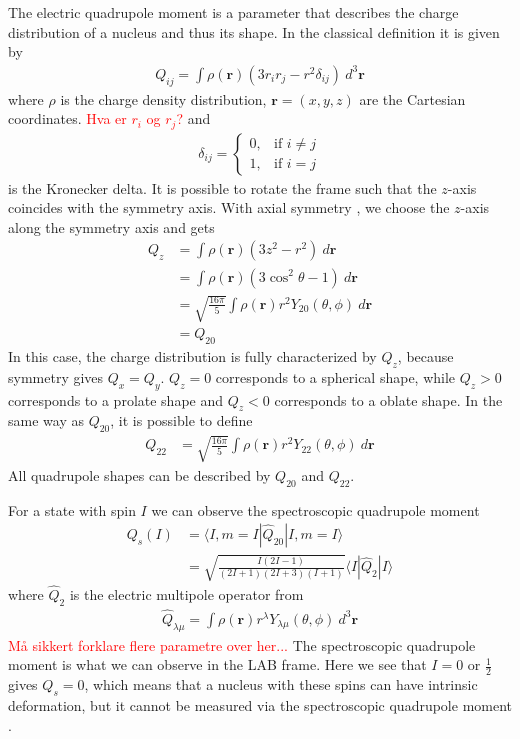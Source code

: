 \documentclass[twoside,english]{uiofysmaster/uiofysmaster}
\begin{document}
The electric quadrupole moment is a parameter that describes the charge distribution of a nucleus and thus its shape.
In the classical definition it is given by
\begin{align}
	Q_{ij} = \int \rho(\mathbf{r}) (3r_i r_j - r^2 \delta_{ij}) ~d^3 \mathbf{r}
\end{align}
where $\rho$ is the charge density distribution, $\mathbf{r} = (x, y, z)$ are the Cartesian coordinates. 
\textcolor{red}{Hva er $r_i$ og $r_j$?}
and
\begin{align}
	\delta_{ij} =
    \begin{cases}
    		0, & \text{if } i \neq j \\
    		1, & \text{if } i = j
    \end{cases}
\end{align}
is the Kronecker delta.
It is possible to rotate the frame such that the $z$-axis coincides with the symmetry axis. 
With axial symmetry \cite{Niedermaier, ELP}, we choose the $z$-axis along the symmetry axis and gets
\begin{align}
	Q_z &= \int \rho(\mathbf{r}) (3z^2 - r^2) ~d \mathbf{r} \nonumber \\
	&=  \int \rho(\mathbf{r}) (3\cos^2 \theta - 1) ~d \mathbf{r} \nonumber \\
	&=  \sqrt{\frac{16\pi}{5}} \int \rho(\mathbf{r}) r^2 Y_{20}(\theta, \phi) ~d \mathbf{r} \nonumber \\
	&= Q_{20}
\end{align}
In this case, the charge distribution is fully characterized by $Q_z$, because symmetry gives $Q_x = Q_y$. 
$Q_z = 0$ corresponds to a spherical shape, while $Q_z > 0$ corresponds to a prolate shape and $Q_z < 0$ corresponds to a oblate shape.
In the same way as $Q_{20}$, it is possible to define 
\begin{align}
	Q_{22} &= \sqrt{\frac{16\pi}{5}} \int \rho(\mathbf{r}) r^2 Y_{22}(\theta, \phi) ~d \mathbf{r}
\end{align}
All quadrupole shapes can be described by $Q_{20}$ and $Q_{22}$.

For a state with spin $I$ we can observe the spectroscopic quadrupole moment
\begin{align}
	Q_s(I) &= \langle I, m = I | \hat{Q}_{20} | I, m = I \rangle \\
	&= \sqrt{\frac{I(2I - 1)}{(2I + 1)(2I + 3)(I + 1)}} \langle I | \hat{Q}_2 | I \rangle
\end{align}
where $\hat{Q}_2$ is the electric multipole operator \cite{RS} from
\begin{align}
	\hat{Q}_{\lambda \mu} = \int \rho(\mathbf{r}) r^\lambda Y_{\lambda \mu}(\theta, \phi) ~d^3 \mathbf{r}
\end{align}
\textcolor{red}{Må sikkert forklare flere parametre over her...}
The spectroscopic quadrupole moment is what we can observe in the LAB frame.
Here we see that $I = 0$ or $\tfrac{1}{2}$ gives $Q_s = 0$, which means that a nucleus with these spins can have intrinsic deformation, but it cannot be measured via the spectroscopic quadrupole moment \cite{ELP}.  
\end{document}
